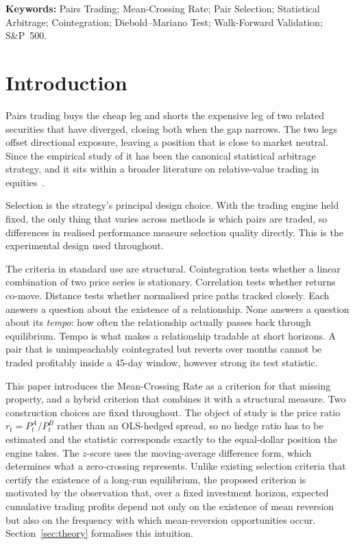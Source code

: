 \documentclass[11pt,a4paper]{article}
\theoremstyle{definition}
\begin{document}
\begin{titlepage}
\begin{center}
\begin{minipage}{0.90\textwidth}
\vspace{8pt}
\noindent\textbf{Keywords:} Pairs Trading; Mean-Crossing Rate; Pair Selection;
Statistical Arbitrage; Cointegration; Diebold--Mariano Test; Walk-Forward
Validation; S\&P~500.
\end{minipage}
\end{center}
\vfill
\end{titlepage}

\setcounter{page}{1}

\section{Introduction}

Pairs trading buys the cheap leg and shorts the expensive leg of two related
securities that have diverged, closing both when the gap narrows. The two legs
offset directional exposure, leaving a position that is close to market neutral.
Since the empirical study of \citet{gatev2006} it has been the canonical
statistical arbitrage strategy, and it sits within a broader literature on
relative-value trading in equities~\citep{avellaneda2010}.

Selection is the strategy's principal design choice. With the trading engine
held fixed, the only thing that varies across methods is which pairs are traded,
so differences in realised performance measure selection quality directly. This
is the experimental design used throughout.

The criteria in standard use are structural. Cointegration tests whether a
linear combination of two price series is stationary. Correlation tests whether
returns co-move. Distance tests whether normalised price paths tracked closely.
Each answers a question about the existence of a relationship. None
answers a question about its \emph{tempo}: how often the relationship actually
passes back through equilibrium. Tempo is what makes a relationship tradable at
short horizons. A pair that is unimpeachably cointegrated but reverts over
months cannot be traded profitably inside a 45-day window, however strong its
test statistic.

This paper introduces the Mean-Crossing Rate as a criterion for that missing
property, and a hybrid criterion that combines it with a structural measure. Two
construction choices are fixed throughout. The object of study is the
price ratio $r_t = P^A_t/P^B_t$ rather than an OLS-hedged spread, so no
hedge ratio has to be estimated and the statistic corresponds exactly to the
equal-dollar position the engine takes. The $z$-score uses the
moving-average difference form, which determines what a zero-crossing
represents. Unlike existing selection criteria that certify the existence of a long-run equilibrium,
the proposed criterion is motivated by the observation that, over a fixed investment
horizon, expected cumulative trading profits depend not only on the existence of
mean reversion but also on the frequency with which mean-reversion opportunities occur.
Section~\ref{sec:theory} formalises this intuition.
\end{document}
